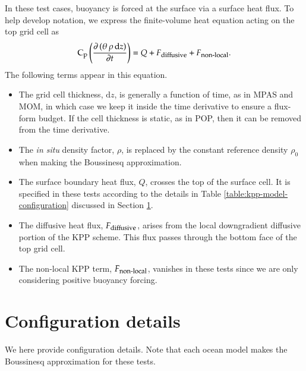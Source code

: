 In these test cases, buoyancy is forced at the surface via a surface
heat flux.  To help develop notation, we express the finite-volume
heat equation acting on the top grid cell as
\begin{equation}
  \mbox{C}_{\mbox{\footnotesize p}} \left(   \frac{\partial  \, (\theta \, \rho \, \mathrm{d}z )}{\partial t}  \right) =  
  Q + F_{\mbox{\footnotesize diffusive}} + F_{\mbox{\footnotesize non-local}}.
\label{eq:surface-heat-equation}
\end{equation}
The following terms appear in this equation.
\begin{itemize}
\item The grid cell thickness, $\mathrm{d}z$, is generally a function
  of time, as in MPAS and MOM, in which case we keep it inside the
  time derivative to ensure a flux-form budget.  If the cell thickness
  is static, as in POP, then it can be removed from the time
  derivative.

\item The {\it in situ} density factor, $\rho$, is replaced by the
  constant reference density $\rho_{0}$ when making the Boussinesq
  approximation.

\item The surface boundary heat flux, $Q$, crosses the top of the
  surface cell.  It is specified in these tests according to the
  details in Table \ref{table:kpp-model-configuration} discussed in
  Section \ref{section:configuration-details-WSwPSBF}.

\item The diffusive heat flux, $F_{\mbox{\footnotesize diffusive}}$,
  arises from the local downgradient diffusive portion of the KPP
  scheme.  This flux passes through the bottom face of the top grid
  cell.

\item The non-local KPP term, $F_{\mbox{\footnotesize non-local}}$,
  vanishes in these tests since we are only considering positive
  buoyancy forcing.

\end{itemize}


\section{Configuration details}
\label{section:configuration-details-WSwPSBF}

We here provide configuration details.  Note that each ocean model
makes the Boussinesq approximation for these tests.


